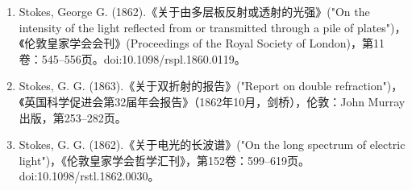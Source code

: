 \begin{enumerate}
\item Stokes, George G. (1862).《关于由多层板反射或透射的光强》("On the intensity of the light reflected from or transmitted through a pile of plates")，《伦敦皇家学会会刊》(Proceedings of the Royal Society of London)，第11卷：545–556页。doi:10.1098/rspl.1860.0119。
\item Stokes, G. G. (1863).《关于双折射的报告》("Report on double refraction")，《英国科学促进会第32届年会报告》（1862年10月，剑桥），伦敦：John Murray 出版，第253–282页。
\item Stokes, G. G. (1862).《关于电光的长波谱》("On the long spectrum of electric light")，《伦敦皇家学会哲学汇刊》，第152卷：599–619页。doi:10.1098/rstl.1862.0030。

\end{enumerate}